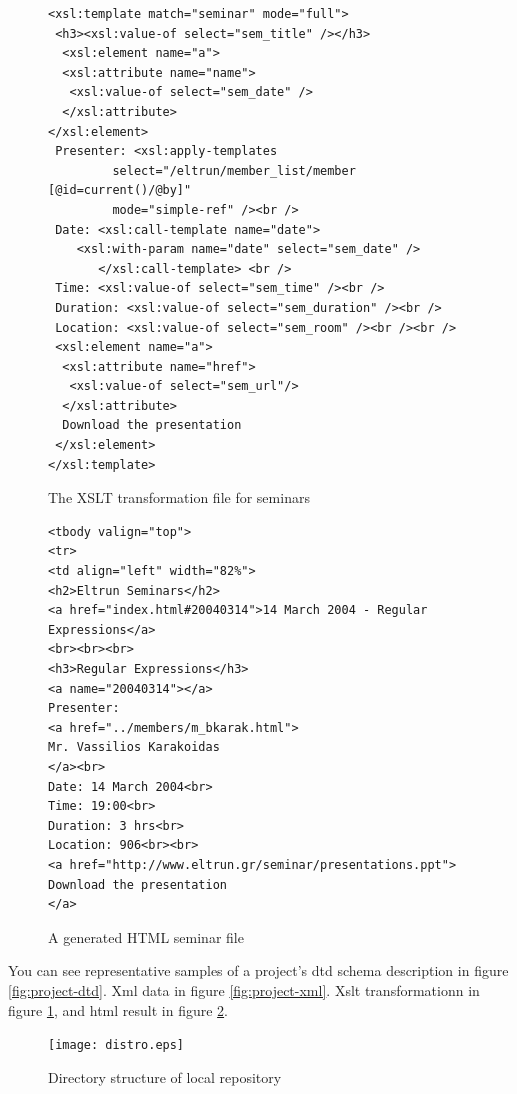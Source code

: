 \documentclass[10pt]{article}
\begin{document}
\begin{figure}[h!]
\lstset{language=MYLANG,basicstyle=\ttfamily}
{\begin{lstlisting}
<xsl:template match="seminar" mode="full">
 <h3><xsl:value-of select="sem_title" /></h3>
  <xsl:element name="a">
  <xsl:attribute name="name">
   <xsl:value-of select="sem_date" />
  </xsl:attribute>
</xsl:element>
 Presenter: <xsl:apply-templates 
 	     select="/eltrun/member_list/member [@id=current()/@by]" 
	     mode="simple-ref" /><br />
 Date: <xsl:call-template name="date">
	<xsl:with-param name="date" select="sem_date" />
       </xsl:call-template> <br />
 Time: <xsl:value-of select="sem_time" /><br />
 Duration: <xsl:value-of select="sem_duration" /><br />
 Location: <xsl:value-of select="sem_room" /><br /><br />
 <xsl:element name="a">
  <xsl:attribute name="href">
   <xsl:value-of select="sem_url"/>
  </xsl:attribute>
  Download the presentation
 </xsl:element>
</xsl:template>
\end{lstlisting}}
\caption{The XSLT transformation file for seminars}
\label{fig:project-xslt}
\end{figure}

\begin{figure}[h!]
\lstset{language=MYLANG,basicstyle=\ttfamily}
{\begin{lstlisting}
<tbody valign="top">
<tr>
<td align="left" width="82%">
<h2>Eltrun Seminars</h2>
<a href="index.html#20040314">14 March 2004 - Regular Expressions</a>
<br><br><br>
<h3>Regular Expressions</h3>
<a name="20040314"></a>
Presenter: 
<a href="../members/m_bkarak.html">
Mr. Vassilios Karakoidas
</a><br>
Date: 14 March 2004<br>
Time: 19:00<br>
Duration: 3 hrs<br>
Location: 906<br><br>
<a href="http://www.eltrun.gr/seminar/presentations.ppt">
Download the presentation
</a>
\end{lstlisting}}
\caption{A generated HTML seminar file}
\label{fig:project-html}
\end{figure}

You can see representative samples of a project's
{\sc dtd} schema description in figure \ref{fig:project-dtd}.
{\sc Xml} data in figure \ref{fig:project-xml}.
{\sc Xslt} transformationn in figure \ref{fig:project-xslt},
and {\sc html} result in figure \ref{fig:project-html}.

\begin{figure}
\texttt{[image: distro.eps]}
\caption{Directory structure of local repository}
\label{fig:eltrun-web-distro}
\end{figure}
\end{document}
